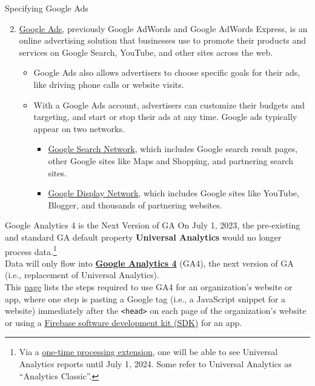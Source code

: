 \documentclass[pdf]{beamer}
\newcommand{\empr}[1]{{\color{franklinblue}\textbf{#1}}}
\theoremstyle{remark}
\theoremstyle{definition}
\begin{document}
\begin{frame}[t]{Specifying Google Ads}
\begin{enumerate}
  \setcounter{enumi}{1}
    \item \href{https://ads.google.com/home/faq/}{Google Ads}, previously Google AdWords and Google AdWords Express, is an online advertising solution that businesses use to promote their products and services on Google Search, YouTube, and other sites across the web.
    \begin{itemize}
      \item Google Ads also allows advertisers to choose specific goals for their ads, like driving phone calls or website visits. 
      \item With a Google Ads account, advertisers can customize their budgets and targeting, and start or stop their ads at any time. Google ads typically appear on two networks. 
      \begin{itemize}
         \item \href{https://support.google.com/google-ads/answer/1722047}{Google Search Network}, which includes Google search result pages, other Google sites like Maps and Shopping, and partnering search sites. 
         \item \href{https://support.google.com/google-ads/answer/2404190?hl=en}{Google Display Network}, which includes Google sites like YouTube, Blogger, and thousands of partnering websites.
      \end{itemize}
    \end{itemize}
\end{enumerate}
\end{frame}

\begin{frame}[t]{Google Analytics 4 is the Next Version of GA}
On July 1, 2023, the pre-existing and standard GA default property \empr{Universal Analytics} would no longer process data.\footnote{Via a \href{https://support.google.com/analytics/answer/11583528?hl=en}{one-time processing extension}, one will be able to see Universal Analytics reports until July 1, 2024.  Some refer to Universal Analytics as ``Analytics Classic''.} \\
\vspace{1.5ex}
Data will only flow into \href{https://support.google.com/analytics/answer/10089681?hl=en}{\empr{Google Analytics 4}} (GA4), the next version of GA (i.e., replacement of Universal Analytics). \\
\vspace{1.5ex}
This \href{https://support.google.com/analytics/answer/9304153?hl=en}{page} lists the steps required to use GA4 for an organization's website or app, where one step is pasting a Google tag (i.e., a JavaScript snippet for a website) immediately after the {\color{treegreen} \texttt{<head>}} on each page of the organization's website or using a \href{https://opensource.google/projects/firebasesdk}{Firebase software development kit (SDK)} for an app. \\
\end{frame}
\end{document}
